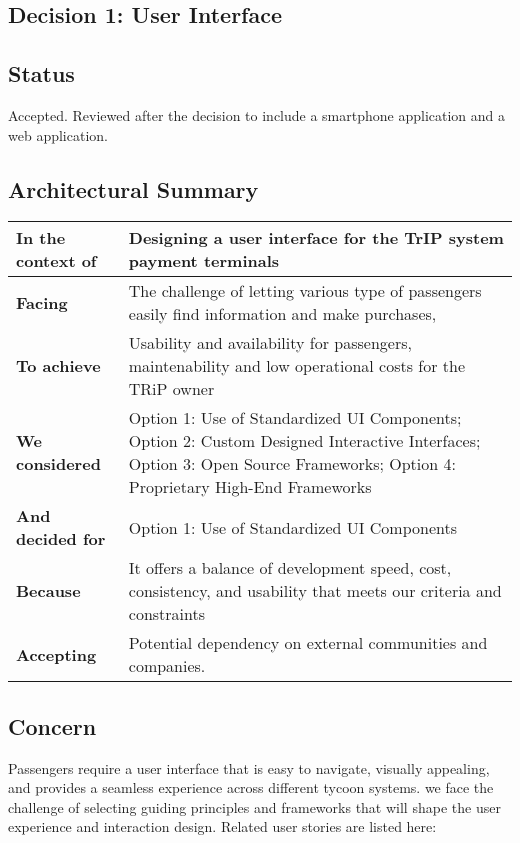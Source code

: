 \subsection{Decision 1: User Interface}

\subsection*{Status}
Accepted. 
Reviewed after the decision to include a smartphone application and a web application.

\subsection*{Architectural Summary}
\begin{tabular}{|p{3.5cm}|p{10.5cm}|}
    \hline
    \textbf{In the context of} & Designing a user interface for the TrIP system payment terminals \\
    \hline
    \textbf{Facing} & The challenge of letting various type of passengers easily find information and make purchases, \\
    \hline
    \textbf{To achieve} & Usability and availability for passengers, maintenability and low operational costs for the TRiP owner\\
    \hline
    \textbf{We considered} & Option 1: Use of Standardized UI Components; Option 2: Custom Designed Interactive Interfaces; Option 3: Open Source Frameworks; Option 4: Proprietary High-End Frameworks \\
    \hline
    \textbf{And decided for} & Option 1: Use of Standardized UI Components \\
    \hline
    \textbf{Because} & It offers a balance of development speed, cost, consistency, and usability that meets our criteria and constraints \\
    \hline
    \textbf{Accepting} & Potential dependency on external communities and companies. \\
    \hline
\end{tabular}

\subsection*{Concern}
Passengers require a user interface that is easy to navigate, visually appealing, and provides a seamless experience across different tycoon systems.
we face the challenge of selecting guiding principles and frameworks that will shape the user experience and interaction design.
Related user stories are listed here:

